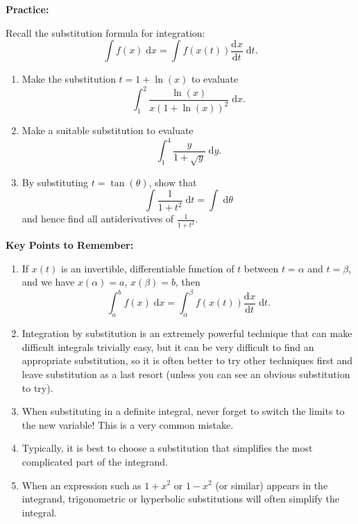 \documentclass{article}
\newcommand{\deriv}[3][]{\frac{\mathrm{d}^{#1}#2}{\mathrm{d}#3^{#1}}}
\newcommand{\diff}{\;\mathrm{d}}
\begin{document}
\clearpage




\textbf{Practice:}\bigskip

Recall the substitution formula for integration:
\[\int f(x)\diff x = \int f(x(t))\deriv{x}{t}\diff t.\]


\begin{enumerate}
	\item Make the substitution $t=1+\ln(x)$ to evaluate
		\[\int_1^2 \frac{\ln(x)}{x(1+\ln(x))^2}\diff x.\]
	\item Make a suitable substitution to evaluate
		\[\int_1^4 \frac{y}{1+\sqrt{y}}\diff y.\]
	\item By substituting $t=\tan(\theta)$, show that
		\[\int \frac{1}{1+t^2}\diff t = \int \!\!\!\diff \theta\]
		and hence find all antiderivatives of $\frac{1}{1+t^2}$.
\end{enumerate}








\clearpage




{\bf Key Points to Remember:}

\vspace{5mm}

\begin{enumerate}
	\item If $x(t)$ is an invertible, differentiable function of $t$ between $t=\alpha$ and $t=\beta$, and we have $x(\alpha)=a$, $x(\beta)=b$, then
		\[\int_a^b f(x)\diff x = \int_\alpha^\beta f(x(t))\deriv{x}{t}\diff t.\]
	\item Integration by substitution is an extremely powerful technique that can make difficult integrals trivially easy, but it can be very difficult to find an appropriate substitution, so it is often better to try other techniques first and leave substitution as a last resort (unless you can see an obvious substitution to try).
	\item When substituting in a definite integral, never forget to switch the limits to the new variable! This is a very common mistake.
	\item Typically, it is best to choose a substitution that simplifies the most complicated part of the integrand.
	\item When an expression such as $1+x^2$ or $1-x^2$ (or similar) appears in the integrand, trigonometric or hyperbolic substitutions will often simplify the integral.
\end{enumerate}
\end{document}

